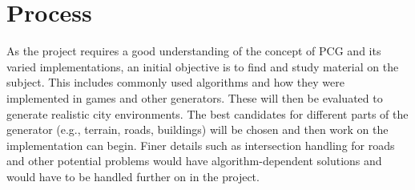 \section{Process}
\begin{comment}
\textcolor{red}{
Hur gruppen har tänkt sig att genomföra arbetet är val av metod. I konstruktionsinriktade projekt kan detta tyckas vara självklart, men det kan även i detta fall finnas viktiga metodval. Helt litteraturbaserade kandidatarbeten är också genomförbara men även en litteraturstudie ska ha en ordnad och strukturerad arbetsprocess och metodik.
\\\\
Metodavsnittet bör också beskriva hur data ska samlas in och hur det konstateras hur väl projektets mål har uppfyllts. I praktiska projekt kan detta vara genom mätningar av olika typer. Det kan också vara genom datorsimuleringar. Vilka aspekter är viktiga för att veta om syftet med projektet har uppnåtts? Datainsamling kan också vara en del av en testning eller annan utvärdering av den produkt som tas fram i ett konstruktionsinriktat projekt.
\begin{itemize}
    \item Antal studieobjekt/testfall och hur de väljs?
    \item Typ av undersökningsmetod/testmetod? 
    \item Hur insamlade data/testresultat ska analyseras och presenteras? 
    \item Hur ser processen ut för litteraturarbetet?
\end{itemize}
}
\textcolor{blue}{
\begin{itemize}
    \item Projektmodell: Scrum
    \item Utvecklingsverktyg: Unity
    \item Programmeringsspråk: C\#
\end{itemize}
}
\end{comment}

As the project requires a good understanding of the concept of PCG and its varied implementations, an initial objective is to find and study material on the subject. This includes commonly used algorithms and how they were implemented in games and other generators. These will then be evaluated to generate realistic city environments. The best candidates for different parts of the generator (e.g., terrain, roads, buildings) will be chosen and then work on the implementation can begin. Finer details such as intersection handling for roads and other potential problems would have algorithm-dependent solutions and would have to be handled further on in the project.

